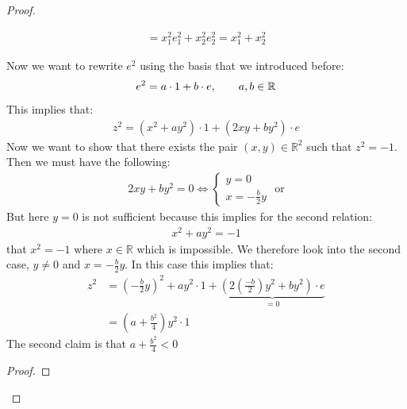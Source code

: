 \begin{proof}
\begin{framedremark}
	\begin{align*} 
		= x_1^2e_1^2 + x_2^2e_2^2 = x_1^2 + x_2^2
	\end{align*}
	\end{framedremark}
	Now we want to rewrite $e^2$ using the basis that we introduced before:
	\begin{align*} 
		e^2 = a \cdot 1 + b \cdot e, \quad \quad a, b \in \mathbb{R}
	\end{align*}
	This implies that:
	\begin{align*} 
		z^2 =  \left(x^2 + ay^2\right) \cdot  1 + \left(2xy + by^2\right) \cdot  e
	\end{align*}
	Now we want to show that there exists the pair $\left(x, y\right) \in \mathbb{R}^{2}$ such that $z^2 = -1$. Then we must have the following:
	\begin{align*} 
		2xy + by^2 = 0 \iff \begin{cases}
		y =  0 \\ x = -\frac{b}{2}y
		\end{cases} \text{ or}
	\end{align*}
	But here $y= 0$ is not sufficient because this implies for the second relation:
	\begin{align*} 
		x^2 + ay^2 = -1
 	\end{align*}
	that $x^2 = -1$ where $x \in \mathbb{R}$ which is impossible. We therefore look into the second case, $y \neq 0$ and $x = -\frac{b}{2}y$. In this case this implies that:
	\begin{align*} 
		z^2 &= \left(-\frac{b}{2}y\right)^2 + ay^2 \cdot 1 + \underbrace{\left(2\left(\frac{-b}{2}\right)y^2 + by^2\right)\cdot  e}_{= 0}\\
		&= \left(a + \frac{b^2}{4}\right)y^2 \cdot  1
	\end{align*}
	The second claim is that $a + \frac{b^2}{4} < 0$
		\begin{proof}
		    

\end{proof}
\end{proof}
